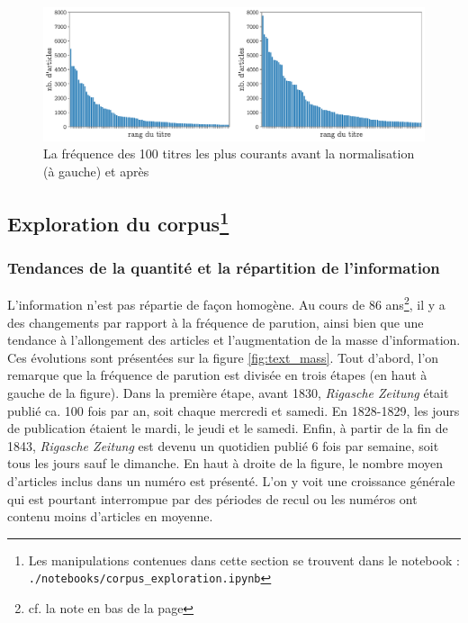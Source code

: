 \documentclass[a4paper,twoside,12pt]{article}
\begin{document}
\begin{figure}[h]
\centering
\captionsetup{justification=centering}
\includegraphics[width=\textwidth]{images/title_normalisation.pdf}
\caption{La fréquence des 100 titres les plus courants avant la normalisation (à gauche) et après}
\label{fig:title_normalisation}
\end{figure}




\subsection{Exploration du corpus\footnote{Les manipulations contenues dans cette section se trouvent dans le notebook :\\ \texttt{./notebooks/corpus\_exploration.ipynb}}} \label{exploration}

\subsubsection{Tendances de la quantité et la répartition de l'information} \label{corpus_tendencies}


L'information n'est pas répartie de façon homogène. Au cours de 86 ans\footnote{cf. la note en bas de la page \pageref{86_years}}, il y a des changements par rapport à la fréquence de parution, ainsi bien que une tendance à l'allongement des articles et l'augmentation de la masse d'information. Ces évolutions sont présentées sur la figure \ref{fig:text_mass}. Tout d'abord, l'on remarque que la fréquence de parution est divisée en trois étapes (en haut à gauche de la figure). Dans la première étape, avant 1830, \textit{Rigasche Zeitung} était publié ca. 100 fois par an, soit chaque mercredi et samedi. En 1828-1829, les jours de publication étaient le mardi, le jeudi et le samedi. Enfin, à partir de la fin de 1843, \textit{Rigasche Zeitung} est devenu un quotidien publié 6 fois par semaine, soit tous les jours sauf le dimanche. En haut à droite de la figure, le nombre moyen d'articles inclus dans un numéro est présenté. L'on y voit une croissance générale qui est pourtant interrompue par des périodes de recul ou les numéros ont contenu moins d'articles en moyenne.
\end{document}
